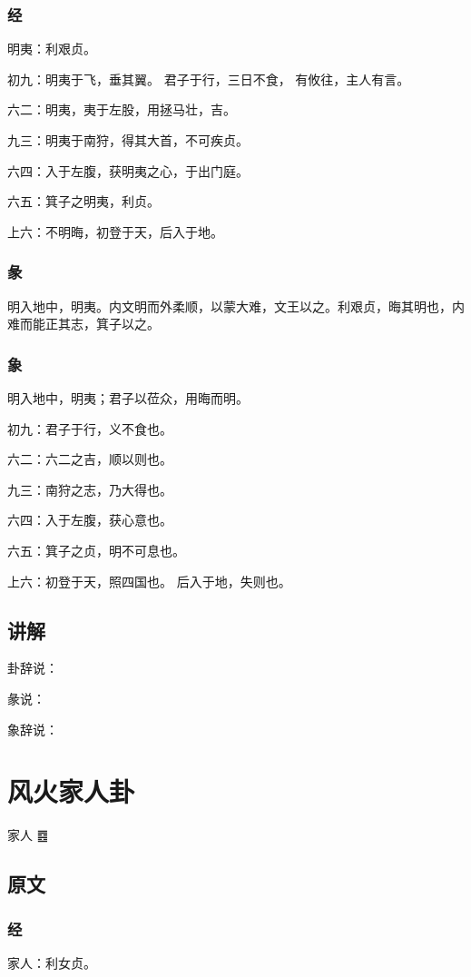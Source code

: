 \documentclass[12pt,oneside]{book}
\begin{document}
\subsection{经}
明夷：利艰贞。

初九：明夷于飞，垂其翼。 君子于行，三日不食， 有攸往，主人有言。

六二：明夷，夷于左股，用拯马壮，吉。

九三：明夷于南狩，得其大首，不可疾贞。

六四：入于左腹，获明夷之心，于出门庭。

六五：箕子之明夷，利贞。

上六：不明晦，初登于天，后入于地。

\subsection{彖}
明入地中，明夷。内文明而外柔顺，以蒙大难，文王以之。利艰贞，晦其明也，内难而能正其志，箕子以之。

\subsection{象}
明入地中，明夷；君子以莅众，用晦而明。

初九：君子于行，义不食也。

六二：六二之吉，顺以则也。

九三：南狩之志，乃大得也。

六四：入于左腹，获心意也。

六五：箕子之贞，明不可息也。

上六：初登于天，照四国也。 后入于地，失则也。

\section{讲解}
卦辞说：

彖说：

象辞说：

\chapter{风火家人卦}
家人 {\Large ䷤}

\section{原文}

\subsection{经}
家人：利女贞。
\end{document}
